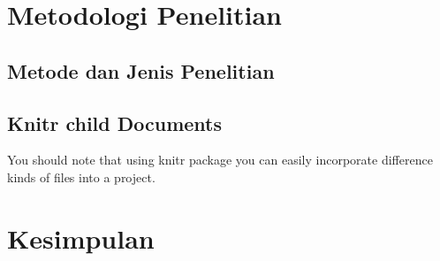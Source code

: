 \documentclass[12pt,oneside]{udthesis}
\begin{document}
\chapter{Metodologi Penelitian}\label{chap:method}

\section{Metode dan Jenis Penelitian}

\limpsum[2-4]

\section{ Knitr child Documents}
You should note that using knitr package you can easily incorporate difference kinds of files into a project.

\tabRegresi
\pieChartFig

\chapter{Kesimpulan}\label{chap:kesimp}


\end{document}

